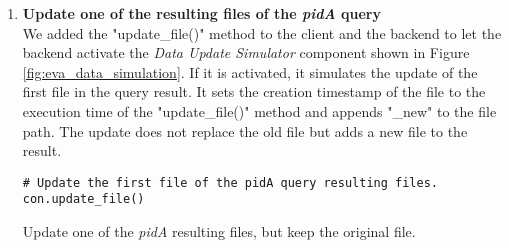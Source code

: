 \documentclass[draft,final]{vutinfth} %
\newenvironment{code}{\captionsetup{type=listing}}{}
\begin{document}
\begin{enumerate}
	\setcounter{enumi}{+1}
	\item \textbf{Update one of the resulting files of the \textit{pidA} query} \\
	We added the "update\_file()" method to the client and the backend to let the backend activate the \textit{Data Update Simulator} component shown in Figure \ref{fig:eva_data_simulation}. If it is activated, it simulates the update of the first file in the query result. It sets the creation timestamp of the file to the execution time of the "update\_file()" method and appends "\_new" to the file path. The update does not replace the old file but adds a new file to the result.
	\begin{code}
		\begin{verbatim}
# Update the first file of the pidA query resulting files.
con.update_file()
		\end{verbatim}
		\caption{Update one of the \textit{pidA} resulting files, but keep the original file.}
		\label{lst:eva_datachange_2}
	\end{code}
	

\end{enumerate}
\end{document}
